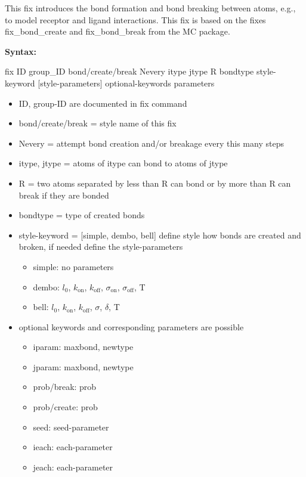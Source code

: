 \documentclass[a4paper,10pt]{scrreprt}
\begin{document}
This fix introduces the bond formation and bond breaking between atoms, e.g., to model receptor and ligand interactions.
This fix is based on the fixes fix\_bond\_create and fix\_bond\_break from the MC package.

{\bfseries Syntax:}

fix ID group\_ID bond/create/break Nevery itype jtype R bondtype style-keyword [style-parameters] optional-keywords parameters

\begin{itemize}

  \item ID, group-ID are documented in fix command
  \item bond/create/break = style name of this fix
  \item Nevery = attempt bond creation and/or breakage every this many steps
  \item itype, jtype = atoms of itype can bond to atoms of jtype
  \item R = two atoms separated by less than R can bond or by more than R can break if they are bonded
  \item bondtype = type of created bonds
  \item style-keyword =  [simple, dembo, bell] define style how bonds are created and broken, if needed define the style-parameters
  \begin{itemize}
    \item simple: no parameters
    \item dembo: $l_0$, $k_\mathrm{on}$, $k_\mathrm{off}$,  $\sigma_\mathrm{on}$, $\sigma_\mathrm{off}$, T
    \item bell: $l_0$, $k_\mathrm{on}$, $k_\mathrm{off}$,  $\sigma$, $\delta$, T
  \end{itemize}
  \item optional keywords and corresponding parameters are possible
  \begin{itemize}
    \item iparam: maxbond, newtype
    \item jparam: maxbond, newtype
    \item prob/break: prob
    \item prob/create: prob
    \item seed: seed-parameter
    \item ieach: each-parameter
    \item jeach: each-parameter
  \end{itemize}

\end{itemize}
\end{document}
